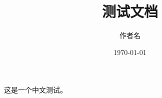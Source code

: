 \documentclass[12pt]{article}
\begin{document}
\title{测试文档}
\author{作者名}
\date{\today}
\maketitle

这是一个中文测试。
\end{document}

